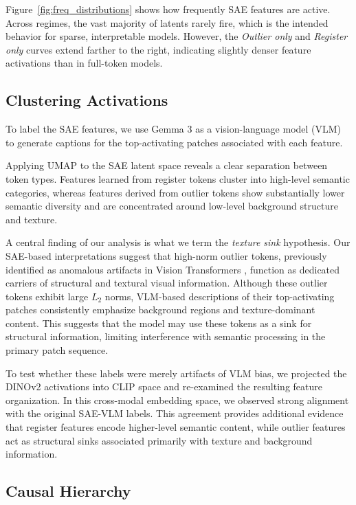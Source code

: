 \documentclass{article}
\theoremstyle{plain}
\theoremstyle{definition}
\theoremstyle{remark}
\begin{document}
Figure~\ref{fig:freq_distributions} shows how frequently SAE features are active. Across regimes, the vast majority of latents rarely fire, which is the intended behavior for sparse, interpretable models. However, the \textit{Outlier only} and \textit{Register only} curves extend farther to the right, indicating slightly denser feature activations than in full-token models.

\subsection{Clustering Activations}
To label the SAE features, we use Gemma 3 as a vision-language model (VLM) to generate captions for the top-activating patches associated with each feature.

Applying UMAP to the SAE latent space reveals a clear separation between token types. Features learned from register tokens cluster into high-level semantic categories, whereas features derived from outlier tokens show substantially lower semantic diversity and are concentrated around low-level background structure and texture.


A central finding of our analysis is what we term the \textit{texture sink} hypothesis. Our SAE-based interpretations suggest that high-norm outlier tokens, previously identified as anomalous artifacts in Vision Transformers \citep{darcet2023vision}, function as dedicated carriers of structural and textural visual information. Although these outlier tokens exhibit large \(L_2\) norms, VLM-based descriptions of their top-activating patches consistently emphasize background regions and texture-dominant content. This suggests that the model may use these tokens as a sink for structural information, limiting interference with semantic processing in the primary patch sequence.

To test whether these labels were merely artifacts of VLM bias, we projected the DINOv2 activations into CLIP space and re-examined the resulting feature organization. In this cross-modal embedding space, we observed strong alignment with the original SAE-VLM labels. This agreement provides additional evidence that register features encode higher-level semantic content, while outlier features act as structural sinks associated primarily with texture and background information.

\subsection{Causal Hierarchy}
\end{document}
